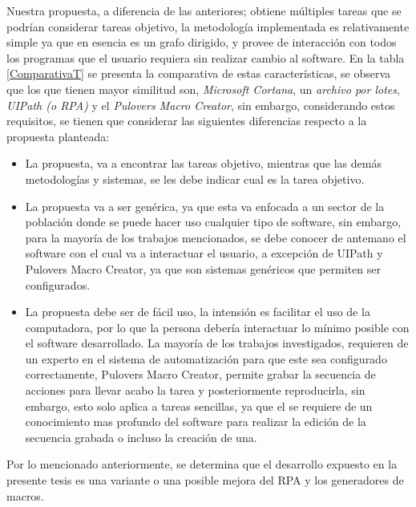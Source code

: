 
Nuestra propuesta, a diferencia de las anteriores; obtiene m\'ultiples tareas
 que se podr\'ian considerar tareas objetivo, la metodolog\'ia implementada 
 es relativamente simple ya que en esencia es un grafo dirigido, y provee de 
 interacci\'on con todos los programas que el usuario requiera sin realizar 
 cambio al software. En la tabla \ref{ComparativaT} se presenta la 
 comparativa de estas caracter\'isticas, se observa que los que tienen mayor 
 similitud son, \emph{Microsoft Cortana}, un \emph{archivo por lotes}, 
 \emph{UIPath (o RPA)} y el \emph{Pulover\textsc{}s Macro Creator},
 sin embargo, considerando estos requisitos, se tienen que considerar las 
 siguientes diferencias respecto a la propuesta planteada:

\begin{itemize}

\item {La propuesta, va a encontrar las tareas objetivo, mientras que las
 dem\'as metodolog\'ias y sistemas, se les debe indicar cual es la tarea
 objetivo.}

\item {La propuesta va a ser gen\'erica, ya que esta va enfocada a un sector
 de la poblaci\'on donde se puede hacer uso cualquier tipo de software, sin
 embargo, para la mayor\'ia de los trabajos mencionados, se debe conocer de
 antemano el software con el cual va a interactuar el usuario, a excepci\'on
 de UIPath y Pulover\textsc{}s Macro Creator, ya que son sistemas
 gen\'ericos que permiten ser configurados.}

\item {La propuesta debe ser de f\'acil uso, la intensi\'on es facilitar el
 uso de la computadora, por lo que la persona deber\'ia interactuar lo
 m\'inimo posible con el software desarrollado. La mayor\'ia de los trabajos 
 investigados, requieren de un experto en el sistema de automatizaci\'on para 
 que este sea configurado correctamente, Pulover\textsc{}s Macro 
 Creator, permite grabar la secuencia de acciones para llevar acabo la tarea 
 y posteriormente reproducirla, sin embargo, esto solo aplica a tareas 
 sencillas, ya que el se requiere de un conocimiento mas profundo del 
 software para realizar la edici\'on de la secuencia grabada o incluso la 
 creaci\'on de una.}

\end{itemize}


Por lo mencionado anteriormente, se determina que el desarrollo expuesto en
 la presente tesis es una variante o una posible mejora del RPA y los
 generadores de macros.



